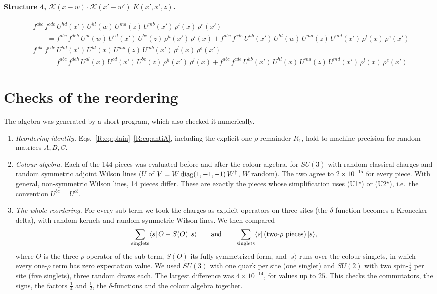\documentclass[10pt]{article}
\numberwithin{equation}{section}
\newcommand{\KK}{\mathcal K}
\begin{document}
\paragraph{Structure 4, $\KK(x-w)\cdot\KK(x'-w')\;K(x',x',z)$.}
\begin{align*}
&f^{abc}\,f^{cde}\,U^{hd}(x')\,U^{hl}(w)\,U^{ma}(z)\,U^{mb}(x')\,\rho^{l}(x)\,\rho^{e}(x')\\&\qquad=f^{abc}\,f^{deh}\,U^{al}(w)\,U^{cd}(x')\,U^{be}(z)\,\rho^{h}(x')\,\rho^{l}(x)+f^{abc}\,f^{cde}\,U^{hb}(x')\,U^{hl}(w)\,U^{ma}(z)\,U^{md}(x')\,\rho^{l}(x)\,\rho^{e}(x')\\&f^{abc}\,f^{cde}\,U^{hd}(x')\,U^{hl}(x)\,U^{ma}(z)\,U^{mb}(x')\,\rho^{l}(x)\,\rho^{e}(x')\\&\qquad=f^{abc}\,f^{deh}\,U^{al}(x)\,U^{cd}(x')\,U^{be}(z)\,\rho^{h}(x')\,\rho^{l}(x)+f^{abc}\,f^{cde}\,U^{hb}(x')\,U^{hl}(x)\,U^{ma}(z)\,U^{md}(x')\,\rho^{l}(x)\,\rho^{e}(x')
\end{align*}

\section{Checks of the reordering}\label{R:app:checks}
The algebra was generated by a short program, which also checked it numerically.
\begin{enumerate}
\item \emph{Reordering identity.} Eqs.~\eqref{R:eq:plain}--\eqref{R:eq:antiA}, including the explicit one-$\rho$ remainder $R_1$, hold to machine precision for random matrices $A,B,C$.
\item \emph{Colour algebra.} Each of the 144 pieces was evaluated before and after the colour algebra, for $SU(3)$ with random classical charges and random symmetric adjoint Wilson lines ($U$ of $V=W\,{\rm diag}(1,-1,-1)\,W^\dagger$, $W$ random). The two agree to $2\times10^{-15}$ for every piece. With general, non-symmetric Wilson lines, 14 pieces differ. These are exactly the pieces whose simplification uses (U1$^\star$) or (U2$^\star$), i.e.\ the convention $U^{bc}=U^{cb}$.
\item \emph{The whole reordering.} For every sub-term we took the charges as explicit operators on three sites (the $\delta$-function becomes a Kronecker delta), with random kernels and random symmetric Wilson lines. We then compared
\begin{equation*}
\sum_{\rm singlets}\langle s|\,O-S(O)\,|s\rangle\qquad\text{and}\qquad\sum_{\rm singlets}\langle s|\,(\text{two-}\rho\text{ pieces})\,|s\rangle ,
\end{equation*}
where $O$ is the three-$\rho$ operator of the sub-term, $S(O)$ its fully symmetrized form, and $|s\rangle$ runs over the colour singlets, in which every one-$\rho$ term has zero expectation value. We used $SU(3)$ with one quark per site (one singlet) and $SU(2)$ with two spin-$\frac12$ per site (five singlets), three random draws each. The largest difference was $4\times10^{-14}$, for values up to $25$. This checks the commutators, the signs, the factors $\frac14$ and $\frac12$, the $\delta$-functions and the colour algebra together.
\end{enumerate}
\end{document}
